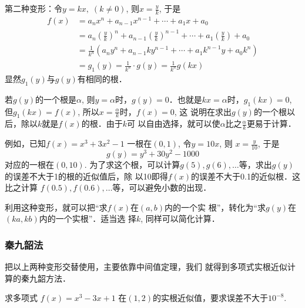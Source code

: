第二种变形：令$y=kx,\; (k\ne 0)$, 则$x=\frac{y}{k}$, 于是
\[\begin{split}
    f(x)&=a_nx^n+a_{n-1}x^{n-1}+\cdots+a_1x+a_0\\
    &=a_n\left(\frac{y}{k}\right)^n+a_{n-1}\left(\frac{y}{k}\right)^{n-1}+\cdots +a_1\left(\frac{y}{k}\right)+a_0\\
    &=\frac{1}{k^n}\left(a_ny^n+a_{n-1}ky^{n-1}+\cdots +a_1k^{n-1}y+a_0 k^n\right)\\
    &=g_1(y)=\frac{1}{k^n}\cdot g(y)=\frac{1}{k^n}g(kx)
\end{split} \]
显然$g_1(y)$与$g(y)$有相同的根．

若$g(y)$的一个根是$\alpha$, 则$y=\alpha$时，$g(y)=0$．也就是$kx=\alpha$时，$g_1(kx)=0$, 但$g_1(kx)=f(x)$, 所以$x=\frac{\alpha}{k}$时，$f(x)=0$, 这
说明在求出$g(y)$的一个根以后，除以$k$就是$f(x)$的根．由于$k$可
以自由选择，就可以使$\alpha$比之$\frac{\alpha}{k}$更易于计算．

例如，已知$f(x)=x^3+3x^2-1$
一根在$(0,1)$, 令$y=10x$, 则
$x=\frac{y}{10}$, 于是
\[g(y)=y^3+30y^2-1000\]
对应的一根在$(0,10)$. 为了求这个根，可以计算$g(5),
g(6),\ldots$等，求出$g(y)$的误差不大于1的根的近似值后，除
以10即得$f(x)$的误差不大于0.1的近似根．这比之计算
$f(0.5),f(0.6),\ldots$等，可以避免小数的出现．

利用这种变形，就可以把“求$f(x)$在$(a,b)$内的一个实
根”，转化为“求$g(y)$在$(ka,kb)$内的一个实根”．适当选
择$k$, 同样可以简化计算．

\subsubsection{秦九韶法}

把以上两种变形交替使用，主要依靠中间值定理，我们
就得到多项式实根近似计算的秦九韶方法．

\begin{example}
    求多项式
$f(x)=x^3-3x+1$
在$(1,2)$的实根近似值，要求误差不大于$10^{-8}$.
\end{example}

